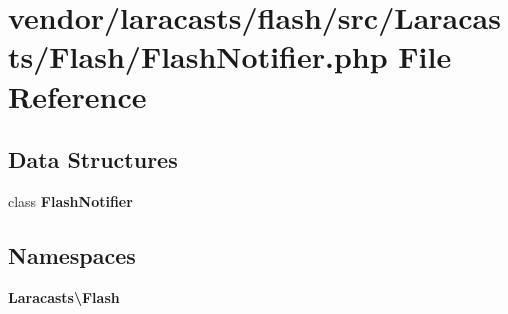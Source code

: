 \section{vendor/laracasts/flash/src/\+Laracasts/\+Flash/\+Flash\+Notifier.php File Reference}
\label{_flash_notifier_8php}
\subsection*{Data Structures}
\begin{DoxyCompactItemize}
\item 
class {\bf Flash\+Notifier}
\end{DoxyCompactItemize}
\subsection*{Namespaces}
\begin{DoxyCompactItemize}
\item 
 {\bf Laracasts\textbackslash{}\+Flash}
\end{DoxyCompactItemize}
